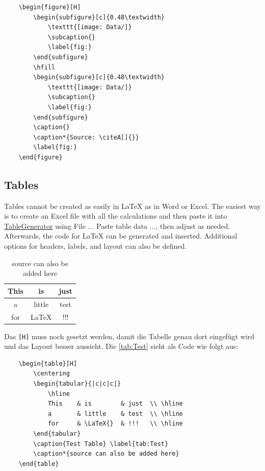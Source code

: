 \begin{verbatim}
    \begin{figure}[H]
        \begin{subfigure}[c]{0.48\textwidth}
            \texttt{[image: Data/]}
            \subcaption{}
            \label{fig:}
        \end{subfigure}
        \hfill
        \begin{subfigure}[c]{0.48\textwidth}
            \texttt{[image: Data/]}
            \subcaption{}
            \label{fig:}
        \end{subfigure}
        \caption{}
        \caption*{Source: \citeA[]{}}
        \label{fig:}
    \end{figure}
\end{verbatim}


\subsection{Tables}

Tables cannot be created as easily in \LaTeX{} as in Word or Excel. The easiest way is to create an Excel file with all the calculations and then paste it into \href{https://www.tablesgenerator.com/latex_tables}{TableGenerator} using File ... Paste table data ..., then adjust as needed. Afterwards, the code for \LaTeX{} can be generated and inserted. Additional options for headers, labels, and layout can also be defined.

\begin{table}[H]
    \centering
    \begin{tabular}{|c|c|c|}
        \hline
        This    & is        & just  \\ \hline
        a       & little    & test  \\ \hline
        for     & \LaTeX{}  & !!!   \\ \hline
    \end{tabular}
    \caption{Test Table} \label{tab:Test}
    \caption*{source can also be added here}
\end{table}

Das \verb|[H]| muss noch gesetzt werden, damit die Tabelle genau dort eingefügt wird und das Layout besser aussieht. Die \autoref{tab:Test} sieht als Code wie folgt aus:

\begin{verbatim}
    \begin{table}[H]
        \centering
        \begin{tabular}{|c|c|c|}
            \hline
            This    & is        & just  \\ \hline
            a       & little    & test  \\ \hline
            for     & \LaTeX{}  & !!!   \\ \hline
        \end{tabular}
        \caption{Test Table} \label{tab:Test}
        \caption*{source can also be added here}
    \end{table}
\end{verbatim}


